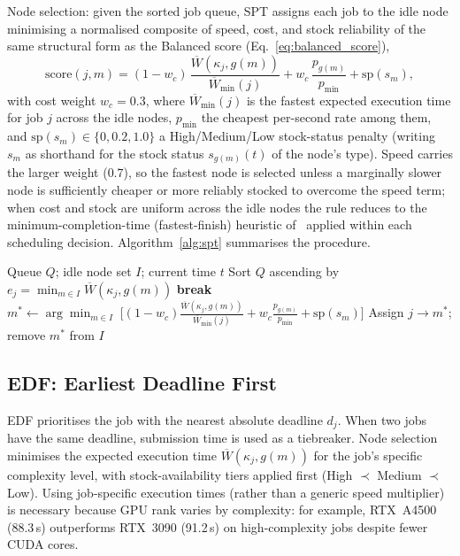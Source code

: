 Node selection: given the sorted job queue, SPT assigns each job to the idle node minimising a normalised composite of speed, cost, and stock reliability of the same structural form as the Balanced score (Eq.~\ref{eq:balanced_score}),
\begin{equation}
\text{score}(j,m) = (1 - w_c)\,\frac{\overline{W}(\kappa_j, g(m))}{\overline{W}_{\min}(j)} + w_c\,\frac{p_{g(m)}}{p_{\min}} + \text{sp}(s_m),
\label{eq:spt_score}
\end{equation}
with cost weight $w_c = 0.3$, where $\overline{W}_{\min}(j)$ is the fastest expected execution time for job $j$ across the idle nodes, $p_{\min}$ the cheapest per-second rate among them, and $\text{sp}(s_m) \in \{0, 0.2, 1.0\}$ a High/Medium/Low stock-status penalty (writing $s_m$ as shorthand for the stock status $s_{g(m)}(t)$ of the node's type). Speed carries the larger weight ($0.7$), so the fastest node is selected unless a marginally slower node is sufficiently cheaper or more reliably stocked to overcome the speed term; when cost and stock are uniform across the idle nodes the rule reduces to the minimum-completion-time (fastest-finish) heuristic of~\cite{braun2001comparison} applied within each scheduling decision. Algorithm~\ref{alg:spt} summarises the procedure.

\begin{algorithm}[H]
\caption{SPT Scheduler}
\label{alg:spt}
\begin{algorithmic}[1]
\REQUIRE Queue $Q$; idle node set $I$; current time $t$
\STATE Sort $Q$ ascending by $e_j = \min_{m \in I} \overline{W}(\kappa_j, g(m))$
   \STATE \textbf{break} \ENDIF
  \STATE $m^* \leftarrow \arg\min_{m \in I}\; \big[(1{-}w_c)\tfrac{\overline{W}(\kappa_j, g(m))}{\overline{W}_{\min}(j)} + w_c\tfrac{p_{g(m)}}{p_{\min}} + \text{sp}(s_m)\big]$ 
  \STATE Assign $j \to m^*$; remove $m^*$ from $I$
\ENDFOR
\end{algorithmic}
\end{algorithm}

\subsection{EDF: Earliest Deadline First}
\label{ssec:edf-earliest-deadline-first}

EDF prioritises the job with the nearest absolute deadline $d_j$. When two jobs have the same deadline, submission time is used as a tiebreaker. Node selection minimises the expected execution time $\overline{W}(\kappa_j, g(m))$ for the job's specific complexity level, with stock-availability tiers applied first (High $\prec$ Medium $\prec$ Low). Using job-specific execution times (rather than a generic speed multiplier) is necessary because GPU rank varies by complexity: for example, RTX~A4500 (88.3\,s) outperforms RTX~3090 (91.2\,s) on high-complexity jobs despite fewer CUDA cores.

